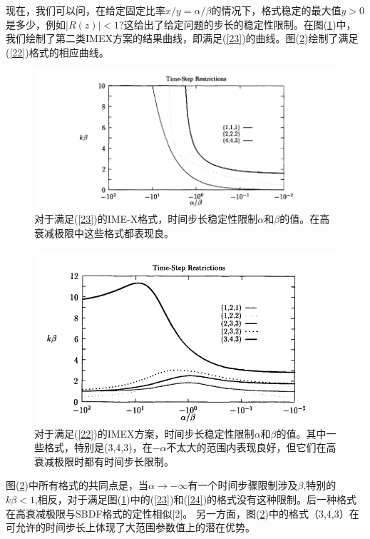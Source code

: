 \documentclass[12pt,a4paper]{article}
\numberwithin{equation}{section}
\begin{document}
现在，我们可以问，在给定固定比率$x/y=\alpha/\beta$的情况下，格式稳定的最大值$y> 0$是多少，例如$|R(z)|<1$?这给出了给定问题的步长的稳定性限制。在图(\ref{figures1})中，我们绘制了第二类IMEX方案的结果曲线，即满足(\ref{23})的曲线。图(\ref{figures2})绘制了满足(\ref{22})格式的相应曲线。

\begin{figure}[H]
\includegraphics[width=15cm]{./figures/1.png}
\caption{对于满足(\ref{23})的IME-X格式，时间步长稳定性限制$\alpha$和$\beta$的值。在高衰减极限中这些格式都表现良。}
\centering
\label{figures1}
\end{figure}
\begin{figure}[H]
\includegraphics[width=15cm]{./figures/2.png}
\caption{对于满足(\ref{22})的IMEX方案，时间步长稳定性限制$\alpha$和$\beta$的值。其中一些格式，特别是(3,4,3)，在$-\alpha$不太大的范围内表现良好，但它们在高衰减极限时都有时间步长限制。}
\centering
\label{figures2}
\end{figure}

图(\ref{figures2})中所有格式的共同点是，当$\alpha\to -\infty$有一个时间步骤限制涉及$\beta$,特别的$k\beta<1$,相反，对于满足图(\ref{figures1})中的(\ref{23})和(\ref{24})的格式没有这种限制。后一种格式在高衰减极限与SBDF格式的定性相似[2]。 另一方面，图(\ref{figures2})中的格式（3,4,3）在可允许的时间步长上体现了大范围参数值上的潜在优势。
\end{document}
